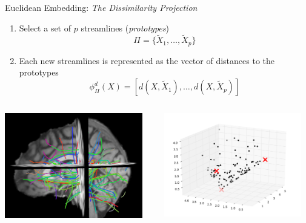 \documentclass{beamer}
\begin{document}
\begin{frame}{Euclidean Embedding: \emph{The Dissimilarity Projection}}
  \begin{enumerate}
  \item Select a set of $p$ streamlines (\emph{prototypes})
    \begin{equation*}
      \Pi = \{\tilde{X}_1, \ldots, \tilde{X}_p\}
    \end{equation*}
  \item Each new streamlines is represented as the vector of
    distances to the prototypes
    \begin{equation*}
      \phi_{\Pi}^d(X) = [d(X,\tilde{X}_1) ,\ldots, d(X,\tilde{X}_p)]
    \end{equation*}
  \end{enumerate}
  \begin{columns}
    \begin{column}{0.5\linewidth}
      \includegraphics[width=6cm]{prni2012b}
    \end{column}
    \begin{column}{0.5\linewidth}
      \includegraphics[width=6cm]{example_2d_dissimilarity}
    \end{column}
  \end{columns}
\end{frame}
\end{document}
